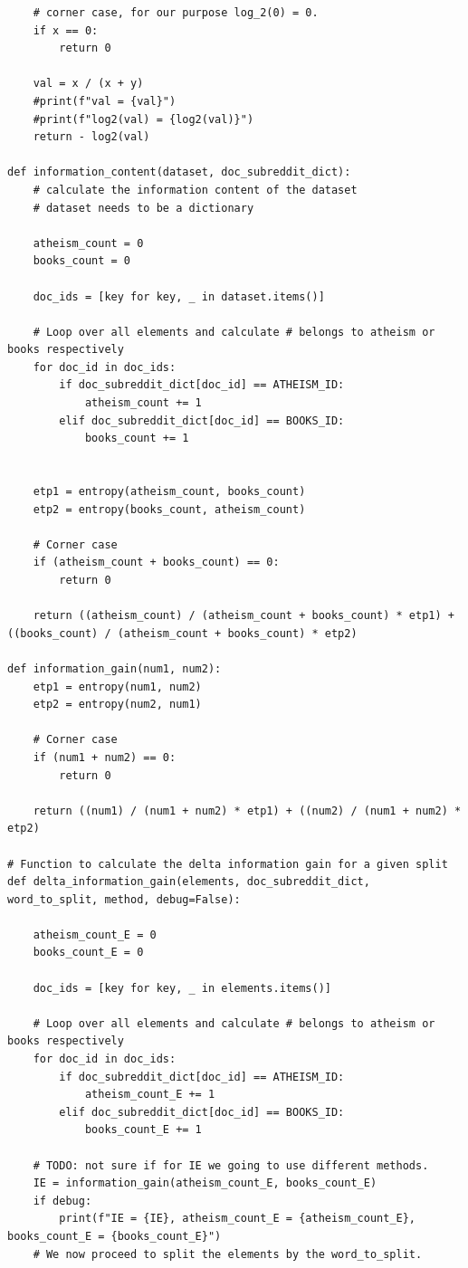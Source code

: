\documentclass[10pt]{article}
\begin{document}
\begin{enumerate}
\begin{lstlisting}
    # corner case, for our purpose log_2(0) = 0.
    if x == 0:
        return 0
    
    val = x / (x + y)
    #print(f"val = {val}")
    #print(f"log2(val) = {log2(val)}")
    return - log2(val)

def information_content(dataset, doc_subreddit_dict):
    # calculate the information content of the dataset
    # dataset needs to be a dictionary
    
    atheism_count = 0
    books_count = 0
    
    doc_ids = [key for key, _ in dataset.items()]
    
    # Loop over all elements and calculate # belongs to atheism or books respectively
    for doc_id in doc_ids:
        if doc_subreddit_dict[doc_id] == ATHEISM_ID:
            atheism_count += 1
        elif doc_subreddit_dict[doc_id] == BOOKS_ID:
            books_count += 1
            
            
    etp1 = entropy(atheism_count, books_count)
    etp2 = entropy(books_count, atheism_count)
    
    # Corner case
    if (atheism_count + books_count) == 0:
        return 0
        
    return ((atheism_count) / (atheism_count + books_count) * etp1) + ((books_count) / (atheism_count + books_count) * etp2)

def information_gain(num1, num2):
    etp1 = entropy(num1, num2)
    etp2 = entropy(num2, num1)
    
    # Corner case
    if (num1 + num2) == 0:
        return 0
        
    return ((num1) / (num1 + num2) * etp1) + ((num2) / (num1 + num2) * etp2)

# Function to calculate the delta information gain for a given split
def delta_information_gain(elements, doc_subreddit_dict, word_to_split, method, debug=False):
    
    atheism_count_E = 0
    books_count_E = 0
    
    doc_ids = [key for key, _ in elements.items()]
    
    # Loop over all elements and calculate # belongs to atheism or books respectively
    for doc_id in doc_ids:
        if doc_subreddit_dict[doc_id] == ATHEISM_ID:
            atheism_count_E += 1
        elif doc_subreddit_dict[doc_id] == BOOKS_ID:
            books_count_E += 1
            
    # TODO: not sure if for IE we going to use different methods.
    IE = information_gain(atheism_count_E, books_count_E)
    if debug:
        print(f"IE = {IE}, atheism_count_E = {atheism_count_E}, books_count_E = {books_count_E}")
    # We now proceed to split the elements by the word_to_split.
    

\end{lstlisting}
\end{enumerate}
\end{document}
